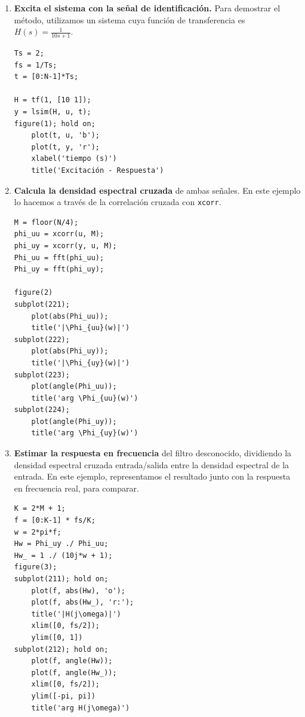\documentclass[10pt,twoside,spanish,a4paper]{article}
\begin{document}
\begin{itemize}
\begin{enumerate}
 	  \item \textbf{Excita el sistema con la señal de identificación.}
 	 Para demostrar el método, utilizamos un sistema cuya función de transferencia es $H(s)=\frac{1}{10 s + 1}$.
  		\begin{lstlisting}[style=Matlab-editor,basicstyle=\scriptsize]
Ts = 2;
fs = 1/Ts;
t = [0:N-1]*Ts;

H = tf(1, [10 1]);
y = lsim(H, u, t);
figure(1); hold on;
	plot(t, u, 'b');
	plot(t, y, 'r');
	xlabel('tiempo (s)')
	title('Excitación - Respuesta')
		  \end{lstlisting}

		\item \textbf{Calcula la densidad espectral cruzada} de ambas señales. En este ejemplo lo hacemos a través de la correlación cruzada con \texttt{xcorr}.
			\begin{lstlisting}[style=Matlab-editor,basicstyle=\scriptsize]
M = floor(N/4);
phi_uu = xcorr(u, M);
phi_uy = xcorr(y, u, M);
Phi_uu = fft(phi_uu);
Phi_uy = fft(phi_uy);

figure(2)
subplot(221);
	plot(abs(Phi_uu));
	title('|\Phi_{uu}(w)|')
subplot(222);
	plot(abs(Phi_uy));
	title('|\Phi_{uy}(w)|')
subplot(223);
	plot(angle(Phi_uu));
	title('arg \Phi_{uu}(w)')
subplot(224);
	plot(angle(Phi_uy));
	title('arg \Phi_{uy}(w)')
		\end{lstlisting}

\newpage
	\item \textbf{Estimar la respuesta en frecuencia} del filtro desconocido, dividiendo
la densidad espectral cruzada entrada/salida entre la densidad espectral de la entrada.
En este ejemplo, representamos el resultado junto con la respuesta en frecuencia real, para
comparar.
		\begin{lstlisting}[style=Matlab-editor,basicstyle=\scriptsize]
K = 2*M + 1;
f = [0:K-1] * fs/K;
w = 2*pi*f;
Hw = Phi_uy ./ Phi_uu;
Hw_ = 1 ./ (10j*w + 1);
figure(3);
subplot(211); hold on;
	plot(f, abs(Hw), 'o');
	plot(f, abs(Hw_), 'r:');
	title('|H(j\omega)|')
	xlim([0, fs/2]);
	ylim([0, 1])
subplot(212); hold on;
	plot(f, angle(Hw));
	plot(f, angle(Hw_));
	xlim([0, fs/2]);
	ylim([-pi, pi])
	title('arg H(j\omega)')
		\end{lstlisting}
  \end{enumerate}

\end{itemize}
\end{document}
